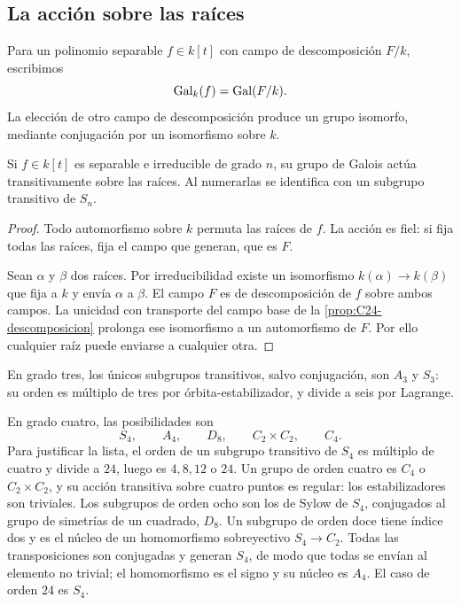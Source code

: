 \subsection{La acción sobre las raíces}\label{tema:27-3-1}
Para un polinomio separable $f\in k[t]$ con campo de descomposición $F/k$, escribimos
\[
\operatorname{Gal}_k(f)=\operatorname{Gal}(F/k).
\]
La elección de otro campo de descomposición produce un grupo isomorfo, mediante conjugación por un isomorfismo sobre $k$.

\begin{lema}\label{lema:C27-transitiva}
Si $f\in k[t]$ es separable e irreducible de grado $n$, su grupo de Galois actúa transitivamente sobre las raíces. Al numerarlas se identifica con un subgrupo transitivo de $S_n$.
\end{lema}
\begin{proof}
Todo automorfismo sobre $k$ permuta las raíces de $f$. La acción es fiel: si fija todas las raíces, fija el campo que generan, que es $F$.

Sean $\alpha$ y $\beta$ dos raíces. Por irreducibilidad existe un isomorfismo $k(\alpha)\to k(\beta)$ que fija a $k$ y envía $\alpha$ a $\beta$. El campo $F$ es de descomposición de $f$ sobre ambos campos. La unicidad con transporte del campo base de la \cref{prop:C24-descomposicion} prolonga ese isomorfismo a un automorfismo de $F$. Por ello cualquier raíz puede enviarse a cualquier otra.
\end{proof}

En grado tres, los únicos subgrupos transitivos, salvo conjugación, son $A_3$ y $S_3$: su orden es múltiplo de tres por órbita-estabilizador, y divide a seis por Lagrange.

En grado cuatro, las posibilidades son
\[
S_4,\qquad A_4,\qquad D_8,\qquad C_2\times C_2,\qquad C_4.
\]
Para justificar la lista, el orden de un subgrupo transitivo de $S_4$ es múltiplo de cuatro y divide a $24$, luego es $4,8,12$ o $24$. Un grupo de orden cuatro es $C_4$ o $C_2\times C_2$, y su acción transitiva sobre cuatro puntos es regular: los estabilizadores son triviales. Los subgrupos de orden ocho son los de Sylow de $S_4$, conjugados al grupo de simetrías de un cuadrado, $D_8$. Un subgrupo de orden doce tiene índice dos y es el núcleo de un homomorfismo sobreyectivo $S_4\to C_2$. Todas las transposiciones son conjugadas y generan $S_4$, de modo que todas se envían al elemento no trivial; el homomorfismo es el signo y su núcleo es $A_4$. El caso de orden $24$ es $S_4$.

